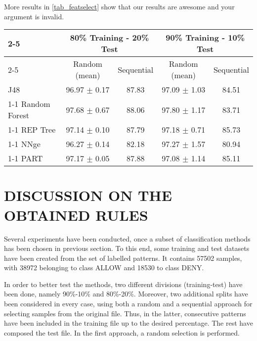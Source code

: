\documentclass{llncs}
\begin{document}
More results in \ref{tab_featselect} show that our results are awesome and your argument is invalid.

\begin{table*}[htpb]
\centering
 \caption{\label{tab_featselect} Percentage of correctly classified patterns for non-balanced data}
{\small
\begin{tabular}{|l|c|c|c|c|}
\cline{2-5}
\multicolumn{1}{l|}{} & \multicolumn{2}{c|}{80\% Training - 20\% Test} & \multicolumn{2}{c|}{90\% Training - 10\% Test} \\ 
\cline{2-5}
\multicolumn{1}{l|}{} & Random (mean) & Sequential & Random (mean) & Sequential \\ 
\hline
J48 & 96.97 $\pm$ 0.17 & 87.83 & 97.09 $\pm$ 1.03 & 84.51 \\ 
\cline{1-1}
Random Forest & 97.68 $\pm$ 0.67 & 88.06 & 97.80 $\pm$ 1.17 & 83.71 \\ 
\cline{1-1}
REP Tree & 97.14 $\pm$ 0.10 & 87.79 & 97.18 $\pm$ 0.71 & 85.73 \\ 
\cline{1-1}
NNge & 96.27 $\pm$ 0.14 & 82.18 & 97.27 $\pm$ 1.57 & 80.94 \\ 
\cline{1-1}
PART & 97.17 $\pm$ 0.05 & 87.88 & 97.08 $\pm$ 1.14 & 85.11 \\ 
\hline
\end{tabular}
}
\end{table*}

%
\section{\uppercase{Discussion on the Obtained Rules}}
\label{sec:rulesdiscussion}

\noindent Several experiments have been conducted, once a subset of classification methods has been chosen in previous section.
To this end, some training and test datasets have been created from
the set of labelled patterns. It contains 57502 samples, with 38972
belonging to class ALLOW and 18530 to class DENY.

In order to better test the methods, two different divisions (training-test) have been done, namely 90\%-10\% and 80\%-20\%. Moreover, two additional splits have been considered in every case, using both a random and a sequential approach for selecting samples from the original file. Thus, in the latter, consecutive patterns have been included in the training file up to the desired percentage. The rest have composed the test file. In the first approach, a random selection is performed.
\end{document}
